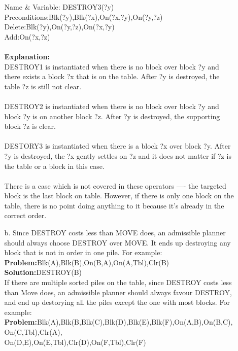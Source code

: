 \documentclass{article}
\begin{document}
\begin{titlepage}
\begin{enumerate}
\begin{enumerate}
   				  Name \& Variable: DESTROY3(?y)\\
   				  Preconditions:Blk(?y),Blk(?x),On(?x,?y),On(?y,?z)\\
   				  Delete:Blk(?y),On(?y,?z),On(?x,?y)\\
   				  Add:On(?x,?z)\\\\
   				  \textbf{Explanation:}\\
   				  DESTROY1 is instantiated when there is no block over block ?y and there exists a block ?x that is on the table. After ?y is destroyed, the table ?z is still not clear.\\\\
                 DESTROY2 is instantiated when there is no block over block ?y and block ?y is on another block ?z. After ?y is destroyed, the supporting block ?z is clear.\\\\
                 DESTORY3 is instantiated when there is a block ?x over block ?y. After ?y is destroyed, the ?x gently settles on ?z and it does not matter if ?z is the table or a block in this case.\\\\
                 There is a case which is not covered in these operators ---- the targeted block is the last block on table. However, if there is only one block on the table, there is no point doing anything to it because it's already in the correct order.\\
   		\item[b.] Since DESTROY costs less than MOVE does, an admissible planner should always choose DESTROY over MOVE. It ends up destroying any block
                   that is not in order in one pile. For example:\\
                   \textbf{Problem:}Blk(A),Blk(B),On(B,A),On(A,Tbl),Clr(B)\\
                   \textbf{Solution:}DESTROY(B)\\
                   If there are multiple sorted piles on the table, since DESTROY costs less than Move does, an admissible planner should always favour DESTROY, and end up destorying all the piles except the one with most blocks. For example:\\
                   \textbf{Problem:}Blk(A),Blk(B,Blk(C),Blk(D),Blk(E),Blk(F),On(A,B),On(B,C),On(C,Tbl),Clr(A),\\
                          On(D,E),On(E,Tbl),Clr(D),On(F,Tbl),Clr(F)\\

\end{enumerate}
\end{enumerate}
\end{titlepage}
\end{document}
